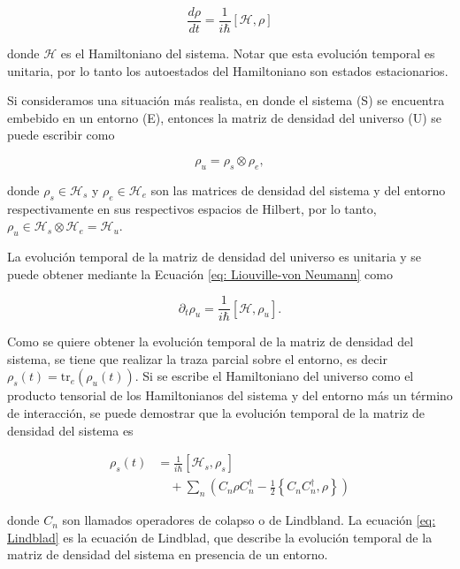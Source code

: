 \begin{equation} \label{eq: Liouville-von Neumann}
    \frac{d\rho}{dt} = \frac{1}{i\hbar}[\mathcal{H},\rho]
\end{equation}

\noindent donde \(\mathcal{H}\) es el Hamiltoniano del sistema. Notar que esta evolución temporal es unitaria, por lo tanto los autoestados del Hamiltoniano son estados estacionarios.

Si consideramos una situación más realista, en donde el sistema (S) se encuentra embebido en un entorno (E), entonces la matriz de densidad del universo (U) se puede escribir como

\begin{equation} \label{eq: dm_u}
    \rho_u = \rho_s \otimes \rho_e,
\end{equation}

\noindent donde \(\rho_s \in \mathcal{H}_s\) y \(\rho_e \in \mathcal{H}_e\) son las matrices de densidad del sistema y del entorno respectivamente en sus respectivos espacios de Hilbert, por lo tanto, \(\rho_u \in \mathcal{H}_s \otimes \mathcal{H}_e = \mathcal{H}_u\).

La evolución temporal de la matriz de densidad del universo es unitaria y se puede obtener mediante la Ecuación \ref{eq: Liouville-von Neumann} como

\begin{equation} \nonumber
    \partial_t \rho_u =  \frac{1}{i\hbar} [\mathcal{H}, \rho_u].
\end{equation}

Como se quiere obtener la evolución temporal de la matriz de densidad del sistema, se tiene que realizar la traza parcial sobre el entorno, es decir \(\rho_s (t) = \text{tr}_e (\rho_u (t))\).  Si se escribe el Hamiltoniano del universo como el producto tensorial de los Hamiltonianos del sistema y del entorno más un término de interacción, se puede demostrar que la evolución temporal de la matriz de densidad del sistema es \cite{BRE02}

\begin{align} \label{eq: Lindblad}
    \rho_s (t) &= \frac{1}{i\hbar} \left[ \mathcal{H}_s, \rho_s \right] \nonumber \\
    &\quad + \sum_n \left(C_n \rho C_n^\dagger - \frac{1}{2}\left\{C_nC_n^\dagger, \rho \right\} \right)
\end{align}

\noindent donde \(C_n\) son llamados operadores de colapso o de Lindbland. La ecuación \ref{eq: Lindblad} es la ecuación de Lindblad, que describe la evolución temporal de la matriz de densidad del sistema en presencia de un entorno.

